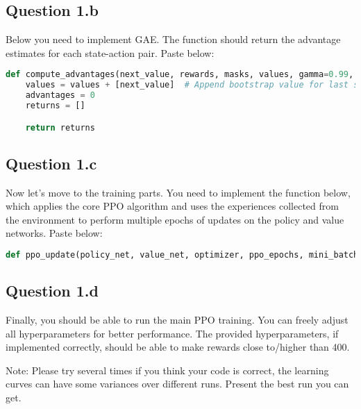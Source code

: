 \documentclass[12pt]{article}
\begin{document}
\subsection*{Question 1.b} 
Below you need to implement GAE. The function should return the advantage estimates for each state-action pair.
Paste below:
\begin{solution}
\begin{lstlisting}[language=Python]
def compute_advantages(next_value, rewards, masks, values, gamma=0.99, lambda_gae=0.95):
    values = values + [next_value]  # Append bootstrap value for last state
    advantages = 0
    returns = []

    return returns
\end{lstlisting}
\end{solution}

\subsection*{Question 1.c} 
Now let's move to the training parts. You need to implement the function below, which applies the core PPO algorithm and uses the experiences collected from the environment to perform multiple epochs of updates on the policy and value networks.
Paste below:
\begin{solution}
\begin{lstlisting}[language=Python]
def ppo_update(policy_net, value_net, optimizer, ppo_epochs, mini_batch_size, states, actions, log_probs, returns, advantages, clip_param=0.2):
\end{lstlisting}
\end{solution}

\subsection*{Question 1.d} 
Finally, you should be able to run the main PPO training.
You can freely adjust all hyperparameters for better performance. The provided hyperparameters, if implemented correctly, should be able to make rewards close to/higher than 400.

Note: Please try several times if you think your code is correct, the learning curves can have some variances over different runs. Present the best run you can get.
\begin{solution}

\end{solution}
\end{document}

